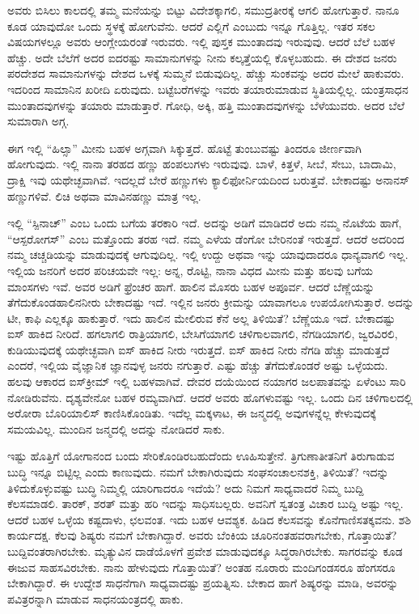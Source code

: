 ಅವರು ಬಿಸಿಲು ಕಾಲದಲ್ಲಿ ತಮ್ಮ ಮನೆಯನ್ನು ಬಿಟ್ಟು ವಿದೇಶಕ್ಕಾಗಲಿ, ಸಮುದ್ರತೀರಕ್ಕೆ ಆಗಲಿ ಹೋಗುತ್ತಾರೆ. ನಾನೂ ಕೂಡ ಯಾವುದೋ ಒಂದು ಸ್ಥಳಕ್ಕೆ ಹೋಗುವೆನು. ಆದರೆ ಎಲ್ಲಿಗೆ ಎಂಬುದು ಇನ್ನೂ ಗೊತ್ತಿಲ್ಲ. ಇತರ ಸಕಲ ವಿಷಯಗಳಲ್ಲೂ ಅವರು ಆಂಗ್ಲೇಯರಂತೆ ಇರುವರು. ಇಲ್ಲಿ ಪುಸ್ತಕ ಮುಂತಾದವು ಇರುವುವು. ಆದರೆ ಬೆಲೆ ಬಹಳ ಹೆಚ್ಚು. ಅದೇ ಬೆಲೆಗೆ ಅದರ ಐದರಷ್ಟು ಸಾಮಾನುಗಳನ್ನು ನೀನು ಕಲ್ಕತ್ತೆಯಲ್ಲಿ ಕೊಳ್ಳಬಹುದು. ಈ ದೇಶದ ಜನರು ಪರದೇಶದ ಸಾಮಾನುಗಳನ್ನು ದೇಶದ ಒಳಕ್ಕೆ ಸುಮ್ಮನೆ ಬಿಡುವುದಿಲ್ಲ. ಹೆಚ್ಚು ಸುಂಕವನ್ನು ಅದರ ಮೇಲೆ ಹಾಕುವರು. ಇದರಿಂದ ಸಾಮಾನಿನ ಖರೀದಿ ಏರುವುದು. ಬಟ್ಟೆಬರೆಗಳನ್ನು ಇವರು ತಯಾರುಮಾಡುವ ಸ್ಥಿತಿಯಲ್ಲಿಲ್ಲ. ಯಂತ್ರಸಾಧನ ಮುಂತಾದವುಗಳನ್ನು ತಯಾರು ಮಾಡುತ್ತಾರೆ. ಗೋಧಿ, ಅಕ್ಕಿ, ಹತ್ತಿ ಮುಂತಾದವುಗಳನ್ನು ಬೆಳೆಯುವರು. ಅದರ ಬೆಲೆ ಸುಮಾರಾಗಿ ಅಗ್ಗ.

ಈಗ ಇಲ್ಲಿ ``ಹಿಲ್ಸಾ'' ಮೀನು ಬಹಳ ಅಗ್ಗವಾಗಿ ಸಿಕ್ಕುತ್ತದೆ. ಹೊಟ್ಟೆ ತುಂಬುವಷ್ಟು ತಿಂದರೂ ಜೀರ್ಣವಾಗಿ ಹೋಗುವುದು. ಇಲ್ಲಿ ನಾನಾ ತರಹದ ಹಣ್ಣು ಹಂಪಲುಗಳು ಇರುವುವು. ಬಾಳೆ, ಕಿತ್ತಳೆ, ಸೀಬೆ, ಸೇಬು, ಬಾದಾಮಿ, ದ್ರಾಕ್ಷಿ ಇವು ಯಥೇಚ್ಛವಾಗಿವೆ. ಇದಲ್ಲದೆ ಬೇರೆ ಹಣ್ಣುಗಳು ಕ್ಯಾಲಿಫೋರ್ನಿಯದಿಂದ ಬರುತ್ತವೆ. ಬೇಕಾದಷ್ಟು ಅನಾನಸ್ ಹಣ್ಣುಗಳಿವೆ. ಲಿಚಿ ಅಥವಾ ಮಾವಿನಹಣ್ಣು ಮಾತ್ರ ಇಲ್ಲ.

ಇಲ್ಲಿ ``ಸ್ಪಿನಾಚ್'' ಎಂಬ ಒಂದು ಬಗೆಯ ತರಕಾರಿ ಇದೆ. ಅದನ್ನು ಅಡಿಗೆ ಮಾಡಿದರೆ ಅದು ನಮ್ಮ ನೊಟೆಯ ಹಾಗೆ, “ಆಸ್ಪರೋಗಸ್'' ಎಂಬ ಮತ್ತೊಂದು ತರಹ ಇದೆ. ನಮ್ಮ ಎಳೆಯ ಡೆಂಗೋ ಬೇರಿನಂತೆ ಇರುತ್ತದೆ. ಆದರೆ ಅದರಿಂದ ನಮ್ಮ ಚಚ್ಚಡಿಯನ್ನು ಮಾಡುವುದಕ್ಕೆ ಆಗುವುದಿಲ್ಲ. ಇಲ್ಲಿ ಉದ್ದು ಅಥವಾ ಇನ್ನು ಯಾವುದಾದರೂ ಧಾನ್ಯವಾಗಲಿ ಇಲ್ಲ. ಇಲ್ಲಿಯ ಜನರಿಗೆ ಅದರ ಪರಿಚಯವೇ ಇಲ್ಲ: ಅನ್ನ, ರೊಟ್ಟಿ, ನಾನಾ ವಿಧದ ಮೀನು ಮತ್ತು ಹಲವು ಬಗೆಯ ಮಾಂಸಗಳು ಇವೆ. ಅವರ ಅಡಿಗೆ ಫ್ರೆಂಚರ ಹಾಗೆ. ಹಾಲಿನ ಮೊಸರು ಬಹಳ ಅಪೂರ್ವ. ಆದರೆ ಬೆಣ್ಣೆಯನ್ನು ತೆಗೆದುಕೊಂಡಹಾಲಿನನೀರು ಬೇಕಾದಷ್ಟು ಇದೆ. ಇಲ್ಲಿನ ಜನರು ಕ್ರೀಮನ್ನು ಯಾವಾಗಲೂ ಉಪಯೋಗಿಸುತ್ತಾರೆ. ಅದನ್ನು ಟೀ, ಕಾಫಿ ಎಲ್ಲಕ್ಕೂ ಹಾಕುತ್ತಾರೆ. ಇದು ಹಾಲಿನ ಮೇಲಿರುವ ಕೆನೆ ಅಲ್ಲ ತಿಳಿಯಿತೆ? ಬೆಣ್ಣೆಯೂ ಇದೆ. ಬೇಕಾದಷ್ಟು ಐಸ್ ಹಾಕಿದ ನೀರಿದೆ. ಹಗಲಾಗಲಿ ರಾತ್ರಿಯಾಗಲಿ, ಬೇಸಿಗೆಯಾಗಲಿ ಚಳಿಗಾಲವಾಗಲಿ, ನೆಗಡಿಯಾಗಲಿ, ಜ್ವರವಿರಲಿ, ಕುಡಿಯುವುದಕ್ಕೆ ಯಥೇಚ್ಛವಾಗಿ ಐಸ್ ಹಾಕಿದ ನೀರು ಇರುತ್ತದೆ. ಐಸ್ ಹಾಕಿದ ನೀರು ನೆಗಡಿ ಹೆಚ್ಚು ಮಾಡುತ್ತದೆ ಎಂದರೆ, ಇಲ್ಲಿಯ ವೈಜ್ಞಾನಿಕ ಜ್ಞಾನವುಳ್ಳ ಜನರು ನಗುತ್ತಾರೆ. ಎಷ್ಟು ಹೆಚ್ಚು ತೆಗೆದುಕೊಂಡರೆ ಅಷ್ಟು ಒಳ್ಳೆಯದು. ಹಲವು ಆಕಾರದ ಐಸ್‌ಕ್ರೀಮ್ ಇಲ್ಲಿ ಬಹಳವಾಗಿವೆ. ದೇವರ ದಯೆಯಿಂದ ನಯಾಗರ ಜಲಪಾತವನ್ನು ಏಳೆಂಟು ಸಾರಿ ನೋಡಿರುವೆನು. ದೃಶ್ಯವೇನೋ ಬಹಳ ರಮ್ಯವಾಗಿದೆ. ಆದರೆ ಅವರು ಹೊಗಳುವಷ್ಟು ಇಲ್ಲ. ಒಂದು ದಿನ ಚಳಿಗಾಲದಲ್ಲಿ ಅರೋರಾ ಬೊರಿಯಾಲಿಸ್ ಕಾಣಿಸಿಕೊಂಡಿತು. ಇದೆಲ್ಲ ಮಕ್ಕಳಾಟ, ಈ ಜನ್ಮದಲ್ಲಿ ಅವುಗಳನ್ನೆಲ್ಲ ಕೇಳುವುದಕ್ಕೆ ಸಮಯವಿಲ್ಲ. ಮುಂದಿನ ಜನ್ಮದಲ್ಲಿ ಅದನ್ನು ನೋಡಿದರೆ ಸಾಕು.

ಇಷ್ಟು ಹೊತ್ತಿಗೆ ಯೋಗಾನಂದ ಬಂದು ಸೇರಿಕೊಂಡಿರಬಹುದೆಂದು ಊಹಿಸುತ್ತೇನೆ. ತ್ರಿಗುಣಾತೀತನಿಗೆ ತಿರುಗಾಡುವ ಬುದ್ಧಿ ಇನ್ನೂ ಬಿಟ್ಟಿಲ್ಲ ಎಂದು ಕಾಣುವುದು. ನಮಗೆ ಬೇಕಾಗಿರುವುದು ಸಂಘಸಂಚಾಲನಶಕ್ತಿ, ತಿಳಿಯಿತೆ? ಇದನ್ನು ತಿಳಿದುಕೊಳ್ಳುವಷ್ಟು ಬುದ್ಧಿ ನಿಮ್ಮಲ್ಲಿ ಯಾರಿಗಾದರೂ ಇದೆಯೆ? ಅದು ನಿಮಗೆ ಸಾಧ್ಯವಾದರೆ ನಿಮ್ಮ ಬುದ್ದಿ ಕೆಲಸಮಾಡಲಿ. ತಾರಕ್, ಶರತ್ ಮತ್ತು ಹರಿ ಇದನ್ನು ಸಾಧಿಸಬಲ್ಲರು.\enginline{-} ಅವನಿಗೆ ಸ್ವತಂತ್ರ ವಿಚಾರ ಬುದ್ದಿ ಅಷ್ಟು ಇಲ್ಲ. ಆದರೆ ಬಹಳ ಒಳ್ಳೆಯ ಕಷ್ಟದಾಳು, ಛಲವಂತ. ಇದು ಬಹಳ ಆವಶ್ಯಕ. ಹಿಡಿದ ಕೆಲಸವನ್ನು ಕೊನೆಗಾಣಿಸತಕ್ಕವನು. ಶಶಿ ಕಾರ್ಯದಕ್ಷ. ಕೆಲವು ಶಿಷ್ಯರು ನಮಗೆ ಬೇಕಾಗಿದ್ದಾರೆ. ಅವರು ಬೆಂಕಿಯ ಚೂರಿನಂತಹವರಾಗಬೇಕು, ಗೊತ್ತಾಯಿತೆ? ಬುದ್ದಿವಂತರಾಗಿರಬೇಕು. ಮೃತ್ಯುವಿನ ದಾಡೆಯೊಳಗೆ ಪ್ರವೇಶ ಮಾಡುವುದಕ್ಕೂ ಸಿದ್ಧರಾಗಿರಬೇಕು. ಸಾಗರವನ್ನು ಕೂಡ ಈಜುವ ಸಾಹಸವಿರಬೇಕು. ನಾನು ಹೇಳುವುದು ಗೊತ್ತಾಯಿತೆ? ಅಂತಹ ನೂರಾರು ಮಂದಿಗಂಡಸರೂ ಹೆಂಗಸರೂ ಬೇಕಾಗಿದ್ದಾರೆ. ಈ ಉದ್ದೇಶ ಸಾಧನೆಗಾಗಿ ಸಾಧ್ಯವಾದಷ್ಟು ಪ್ರಯತ್ನಿಸು. ಬೇಕಾದ ಹಾಗೆ ಶಿಷ್ಯರನ್ನು ಮಾಡಿ, ಅವರನ್ನು ಪವಿತ್ರರನ್ನಾಗಿ ಮಾಡುವ ಸಾಧನಯಂತ್ರದಲ್ಲಿ ಹಾಕು.

